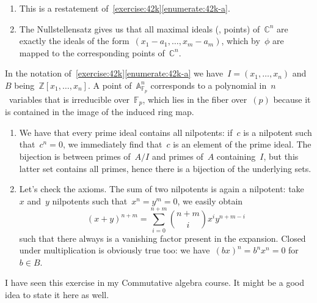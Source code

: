 \begin{exercise} %
  \begin{enumerate}
    \item This is a restatement of~\autoref{exercise:42k}\ref{enumerate:42k-a}.

    \item The Nullstellensatz gives us that all maximal ideals (\ie, points) of~$\mathbb{C}^n$ are exactly the ideals of the form~$(x_1-a_1,\ldots,x_m-a_m)$, which by~$\phi$ are mapped to the corresponding points of~$\mathbb{C}^n$.
  \end{enumerate}
\end{exercise}

\begin{exercise} %
  In the notation of~\autoref{exercise:42k}\ref{enumerate:42k-a} we have~$I=(x_1,\ldots,x_n)$ and~$B$ being~$\mathbb{Z}[x_1,\ldots,x_n]$. A point of~$\mathbb{A}_{\mathbb{F}_p}^n$ corresponds to a polynomial in~$n$~variables that is irreducible over~$\mathbb{F}_p$, which lies in the fiber over~$(p)$ because it is contained in the image of the induced ring map.
\end{exercise}

\begin{exercise}
  \begin{enumerate}
    \item We have that every prime ideal contains all nilpotents: if~$c$ is a nilpotent such that~$c^n=0$, we immediately find that~$c$ is an element of the prime ideal. The bijection is between primes of~$A/I$ and primes of~$A$ containing~$I$, but this latter set contains all primes, hence there is a bijection of the underlying sets.

    \item Let's check the axioms. The sum of two nilpotents is again a nilpotent: take~$x$ and~$y$ nilpotents such that~$x^n=y^m=0$, we easily obtain
      \begin{equation}
        (x+y)^{n+m}=\sum_{i=0}^{n+m}\binom{n+m}{i}x^iy^{n+m-i}
      \end{equation}
      such that there always is a vanishing factor present in the expansion. Closed under multiplication is obviously true too: we have~$(bx)^n=b^nx^n=0$ for~$b\in B$.
  \end{enumerate}
\end{exercise}

\begin{exercise} %
  I have seen this exercise in my Commutative algebra course. It might be a good idea to state it here as well.
\end{exercise}

